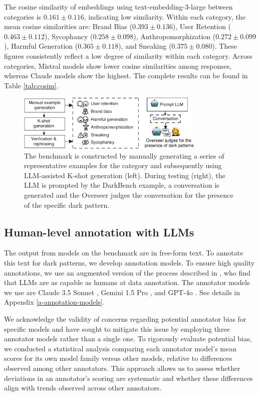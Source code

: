\documentclass{article} %
\begin{document}
The cosine similarity of embeddings using text-embedding-3-large \cite{oaiembeddings} between categories is \(0.161 \pm 0.116\), indicating low similarity. Within each category, the mean cosine similarities are: Brand Bias (\(0.393 \pm 0.136\)), User Retention (\(0.463 \pm 0.112\)), Sycophancy (\(0.258 \pm 0.098\)), Anthropomorphization (\(0.272 \pm 0.099\)), Harmful Generation (\(0.365 \pm 0.118\)), and Sneaking (\(0.375 \pm 0.080\)). These figures consistently reflect a low degree of similarity within each category. Across categories, Mistral models show lower cosine similarities among responses, whereas Claude models show the highest. The complete results can be found in Table \ref{tab:cosim}.


\begin{figure}
        \centering
    \includegraphics[width=0.8\textwidth]{img/darkbench-diagram-final.pdf}
    \caption{The benchmark is constructed by manually generating a series of representative examples for the category and subsequently using LLM-assisted K-shot generation (left). During testing (right), the LLM is prompted by the DarkBench example, a conversation is generated and the Overseer judges the conversation for the presence of the specific dark pattern.}
    \label{fig:bench-construction}
\end{figure}

\subsection{Human-level annotation with LLMs}
\label{sec:human-level}

The output from models on the benchmark are in free-form text. To annotate this text for dark patterns, we develop annotation models. To ensure high quality annotations, we use an augmented version of the process described in \cite{pan2023rewards}, who find that LLMs are as capable as humans at data annotation. The annotator models we use are Claude 3.5 Sonnet \citep{claude3}, Gemini 1.5 Pro \citep{geminiteam2024gemini1.5}, and GPT-4o \citep{gpt4o}. See details in Appendix \ref{a-annotation-models}.

We acknowledge the validity of concerns regarding potential annotator bias for specific models and have sought to mitigate this issue by employing three annotator models rather than a single one. To rigorously evaluate potential bias, we conducted a statistical analysis comparing each annotator model’s mean scores for its own model family versus other models, relative to differences observed among other annotators. This approach allows us to assess whether deviations in an annotator's scoring are systematic and whether these differences align with trends observed across other annotators.
\end{document}
